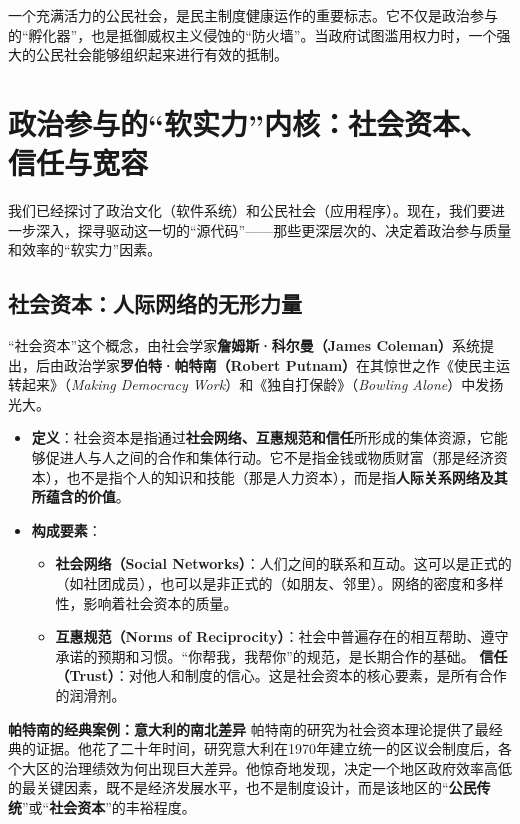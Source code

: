 一个充满活力的公民社会，是民主制度健康运作的重要标志。它不仅是政治参与的“孵化器”，也是抵御威权主义侵蚀的“防火墙”。当政府试图滥用权力时，一个强大的公民社会能够组织起来进行有效的抵制。

\hrulefill

\section{政治参与的“软实力”内核：社会资本、信任与宽容}

我们已经探讨了政治文化（软件系统）和公民社会（应用程序）。现在，我们要进一步深入，探寻驱动这一切的“源代码”——那些更深层次的、决定着政治参与质量和效率的“软实力”因素。

\subsection{社会资本：人际网络的无形力量}

“社会资本”这个概念，由社会学家\textbf{詹姆斯·科尔曼（James Coleman）}系统提出，后由政治学家\textbf{罗伯特·帕特南（Robert Putnam）}在其惊世之作《使民主运转起来》（\textit{Making Democracy Work}）和《独自打保龄》（\textit{Bowling Alone}）中发扬光大。

\begin{itemize}
    \item \textbf{定义}：社会资本是指通过\textbf{社会网络、互惠规范和信任}所形成的集体资源，它能够促进人与人之间的合作和集体行动。它不是指金钱或物质财富（那是经济资本），也不是指个人的知识和技能（那是人力资本），而是指\textbf{人际关系网络及其所蕴含的价值}。
    \item \textbf{构成要素}：
    \begin{itemize}
        \item \textbf{社会网络（Social Networks）}：人们之间的联系和互动。这可以是正式的（如社团成员），也可以是非正式的（如朋友、邻里）。网络的密度和多样性，影响着社会资本的质量。
        \item \textbf{互惠规范（Norms of Reciprocity）}：社会中普遍存在的相互帮助、遵守承诺的预期和习惯。“你帮我，我帮你”的规范，是长期合作的基础。
        \textbf{信任（Trust）}：对他人和制度的信心。这是社会资本的核心要素，是所有合作的润滑剂。
    \end{itemize}
\end{itemize}

\textbf{帕特南的经典案例：意大利的南北差异}
帕特南的研究为社会资本理论提供了最经典的证据。他花了二十年时间，研究意大利在1970年建立统一的区议会制度后，各个大区的治理绩效为何出现巨大差异。他惊奇地发现，决定一个地区政府效率高低的最关键因素，既不是经济发展水平，也不是制度设计，而是该地区的“\textbf{公民传统}”或“\textbf{社会资本}”的丰裕程度。

